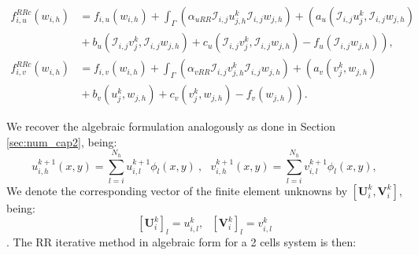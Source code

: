 \begin{align}\label{eq:fu&fvRRInt}
 f_{i,u}^{RRc}(w_{i,h}) & = f_{i,u}(w_{i,h}) + \int_{\Gamma} \left(\alpha_{uRR} \mathcal{I}_{i,j} u_{j,h}^{k} \mathcal{I}_{i,j}w_{j,h} \right) +  \left( a_u(\mathcal{I}_{i,j} u_j^k,\mathcal{I}_{i,j} w_{j,h}) \right. \nonumber
\\ & \left. {} + b_u(\mathcal{I}_{i,j}v_j^k, \mathcal{I}_{i,j} w_{j,h}) + c_u(\mathcal{I}_{i,j} v_j^k, \mathcal{I}_{i,j} w_{j,h})- f_u(\mathcal{I}_{i,j} w_{j,h}) \right), \\
f_{i,v}^{RRc}(w_{i,h}) & = f_{i,v}(w_{i,h}) + \int_{\Gamma} \left(\alpha_{vRR} \mathcal{I}_{i,j} v_{j,h}^{k} \mathcal{I}_{i,j} w_{j,h} \right) + \left( a_v(v_j^k, w_{j,h})  \right. \nonumber
\\ & \left. {} + b_v(u_j^k,w_{j,h}) + c_v(v_j^k, w_{j,h})- f_v(w_{j,h}) \right).
\end{align}

We recover the algebraic formulation analogously as done in Section \ref{sec:num_cap2}, being:
\begin{equation}
        u_{i,h}^{k+1}(x,y) = \sum_{l=i}^{N_h} u_{i,l}^{k+1} \phi_l(x,y) \ , \ \ \ v_{i,h}^{k+1}(x,y) = \sum_{l=i}^{N_h} v_{i,l}^{k+1} \phi_l(x,y),
\end{equation}
We denote the corresponding vector of the finite element unknowns by $\left[\mathbf{U}_i^{k}, \mathbf{V}_i^{k}\right]$, being: $$    \left[\mathbf{U}_i^{k}\right]_l = u^k_{i,l}, \ \ \ \left[\mathbf{V}_i^{k}\right]_l = v^k_{i,l}$$.
The RR iterative method in algebraic form for a 2 cells system is then:

